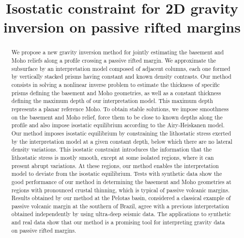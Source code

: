 \documentclass[manuscript]{geophysics}
\begin{document}
\title{Isostatic constraint for 2D gravity inversion on passive rifted margins}

\renewcommand{\thefootnote}{\fnsymbol{footnote}} 




\maketitle

\begin{abstract}

We propose a new gravity inversion method for jointly estimating the basement and 
Moho reliefs along a profile crossing a passive rifted margin.
We approximate the subsurface by an interpretation model composed of 
adjacent columns, each one formed by vertically stacked prisms having constant 
and known density contrasts.
Our method consists in solving a nonlinear inverse problem to estimate the 
thickness of specific prisms defining the basement and Moho geometries, 
as well as a constant thickness defining the maximum depth of our interpretation 
model.
This maximum depth represents a planar reference Moho.
To obtain stable solutions, we impose smoothness on the basement and Moho relief,
force them to be close to known depths along the profile and also impose
isostatic equilibrium according to the Airy-Heiskanen model.
Our method imposes isostatic equilibrium by constraining the lithostatic stress 
exerted by the interpretation model at a given constant depth, 
below which there are no lateral density variations.
This isostatic constraint introduces the information that the lithostatic stress 
is mostly smooth, except at some isolated regions, where it can present abrupt 
variations. At these regions, our method enables the interpretation model to deviate
from the isostatic equilibrium.
Tests with synthetic data show the good performance of our method in
determining the basement and Moho geometries at regions with  
pronounced crustal thinning, which is typical of passive volcanic margins.
Results obtained by our method at the Pelotas basin, considered a classical example
of passive volcanic margin at the southern of Brazil, agree with a previous
interpretation obtained independently by using ultra-deep seismic data.
The applications to synthetic and real data show that our method is a
promising tool for interpreting gravity data on passive rifted margins.


\end{abstract}
\end{document}
